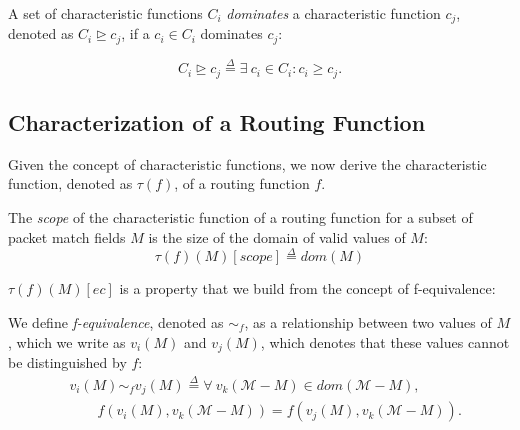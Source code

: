 
\begin{definition}
A set of characteristic functions $C_i$ {\em dominates} a characteristic function $c_j$, denoted as $C_i \trianglerighteq c_j$, if a $c_i \in C_i$ dominates $c_j$:

\begin{equation*}
C_i \trianglerighteq c_j \overset{\Delta}{=} \exists\ c_i \in C_i : c_i \geq c_j.
\end{equation*}
\end{definition}
 
\subsection{Characterization of a Routing Function} 
Given the concept of characteristic functions, we now derive the characteristic function, denoted as $\tau(f)$, of a routing function $f$. 

\begin{definition}
\label{def:set-comparator}
The {\em scope} of the characteristic function of a routing function for a subset of packet match fields $M$ is the size of the domain of valid values of $M$:
\begin{equation*}
\tau(f)(M)[scope] \overset{\Delta}{=} dom(M)
\end{equation*}
\end{definition}

$\tau(f)(M)[ec]$ is a property that we build from the concept of f-equivalence: 
\begin{definition} We define {\em f-equivalence}, denoted as $\sim_f$, as a relationship between two values of $M$, which we write as $v_i(M)$ and $v_j(M)$, which denotes that these values cannot be distinguished by $f$:
\begin{equation*}
\begin{split}
&v_i(M) \sim_f v_j(M) \overset{\Delta}{=} \forall\ v_k(\mathcal{M} - M) \in dom(\mathcal{M} - M),\\
&\qquad f(v_i(M), v_k(\mathcal{M} - M)) = f(v_j(M), v_k(\mathcal{M} - M)). 
\end{split}
\end{equation*}
\end{definition}

